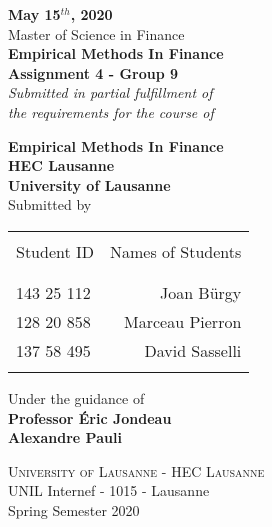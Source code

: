 \begin{titlepage}

\begin{center}

\textup{\small {\bf May 15$^{th}$, 2020} \\ Master of Science in Finance}\\[0.2in]

\Large \textbf {Empirical Methods In Finance \\ Assignment 4 - Group 9}\\[0.5in]

       \small \emph{Submitted in partial fulfillment of\\
        the requirements for the course of}
        \vspace{.2in}

       {\bf Empirical Methods In Finance \\ HEC Lausanne \\ University of Lausanne}\\[0.5in]

\normalsize Submitted by \\
\begin{table}[h]
\centering
\begin{tabular}{lr}\hline \\
Student ID & Names of Students \\ \\ \hline
\\
143 25 112 & Joan B\"{u}rgy \\
128 20 858 & Marceau Pierron \\
137 58 495 & David Sasselli \\ \\ \hline 
\end{tabular}
\end{table}

\vspace{.1in}
Under the guidance of\\
{\textbf{Professor \'{E}ric Jondeau \\
            Alexandre Pauli}}\\[0.2in]

\vfill

\normalsize
\textsc{University of Lausanne - HEC Lausanne}\\
UNIL Internef - 1015 - Lausanne \\
\vspace{0.2cm}
Spring Semester 2020

\end{center}

\end{titlepage}
